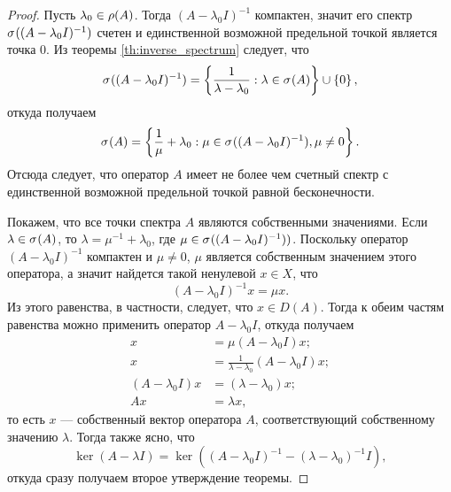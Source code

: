 \begin{proof}
    Пусть $\lambda_0 \in \operatorname{\rho}(A)$. Тогда $(A - \lambda_0 I)^{-1}$ компактен, значит его спектр
    $\spectrum{(A - \lambda_0 I)^{-1}}$ счетен и единственной возможной предельной точкой является
    точка $0$. Из теоремы \ref{th:inverse_spectrum} следует, что
    \[ \spectrum{(A- \lambda_0 I)^{-1}} = \menge{\frac{1}{\lambda - \lambda_0} : \lambda \in 
        \spectrum{A}} \cup \menge{0},\]
    откуда получаем 
    \[ \spectrum{A} = \menge{\frac{1}{\mu} + \lambda_0 : \mu \in 
        \spectrum{(A- \lambda_0 I)^{-1}}, \mu \neq 0}. \]
    Отсюда следует, что оператор $A$ имеет не более чем счетный спектр с единственной
    возможной предельной точкой равной бесконечности.

    Покажем, что все точки спектра $A$ являются собственными значениями.
    Если $\lambda \in \spectrum{A}$, то $\lambda = \mu^{-1} + \lambda_0$, где 
    $\mu \in \spectrum{(A - \lambda_0 I)^{-1})}$. Поскольку оператор $(A - \lambda_0 I)^{-1}$ 
    компактен и $\mu \neq 0$, $\mu$ является собственным значением этого оператора, а значит
    найдется такой ненулевой $x \in X$, что
    \[ (A - \lambda_0 I)^{-1} x = \mu x. \]
    Из этого равенства, в частности, следует, что $x \in D(A)$. Тогда к обеим частям равенства
    можно применить оператор $A - \lambda_0 I$, откуда получаем
    \begin{align*}
        x &= \mu(A - \lambda_0 I) x; \\
        x &= \frac{1}{\lambda - \lambda_0} (A - \lambda_0 I) x; \\
        (A - \lambda_0 I) x &= (\lambda - \lambda_0)x; \\
        Ax &= \lambda x,
    \end{align*}
    то есть $x$ --- собственный вектор оператора $A$, соответствующий собственному значению
    $\lambda$. Тогда также ясно, что 
    \[ \ker(A - \lambda I) = \ker((A - \lambda_0 I)^{-1} - (\lambda - \lambda_0)^{-1} I), \]
    откуда сразу получаем второе утверждение теоремы.
\end{proof}

